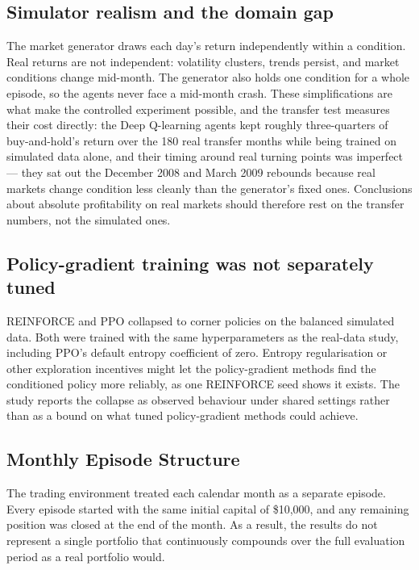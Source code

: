 \subsection{Simulator realism and the domain gap}

The market generator draws each day's return independently within a
condition. Real returns are not independent: volatility clusters, trends
persist, and market conditions change mid-month. The generator also holds
one condition for a whole episode, so the agents never face a mid-month
crash.
These simplifications are what make the controlled experiment possible,
and the transfer test measures their cost directly: the Deep Q-learning agents
kept roughly three-quarters of buy-and-hold's return over the 180 real
transfer months while being trained on simulated data alone, and their
timing around real turning points was imperfect --- they sat out the
December 2008 and March 2009 rebounds because real markets change
condition less cleanly than the generator's fixed ones.
Conclusions about absolute profitability on real markets should
therefore rest on the transfer numbers, not the simulated ones.

\subsection{Policy-gradient training was not separately tuned}

REINFORCE and PPO collapsed to corner policies on the balanced simulated
data. Both were trained with the same hyperparameters as the real-data
study, including PPO's default entropy coefficient of zero. Entropy
regularisation or other exploration incentives might let the
policy-gradient methods find the conditioned policy more reliably, as
one REINFORCE seed shows it exists. The study reports the collapse as
observed behaviour under shared settings rather than as a bound on what
tuned policy-gradient methods could achieve.

\subsection{Monthly Episode Structure}

The trading environment treated each calendar month as a separate
episode. Every episode started with the same initial capital of
\$10,000, and any remaining position was closed at the end of the month.
As a result, the results do not represent a single portfolio that
continuously compounds over the full evaluation period as a real
portfolio would.

